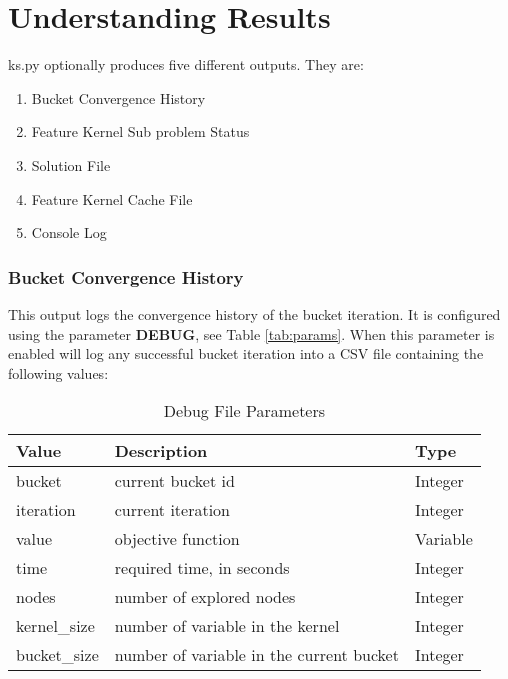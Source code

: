 \section{Understanding Results}
    ks.py optionally produces five different outputs. They are:
    \begin{enumerate}
        \item Bucket Convergence History
        \item Feature Kernel Sub problem Status
        \item Solution File
        \item Feature Kernel Cache File 
        \item Console Log
    \end{enumerate}
    
    \subsubsection{Bucket Convergence History} 
        This output logs the convergence history of the bucket iteration. It is configured using the parameter 
        \textbf{DEBUG}, see Table \ref{tab:params}. When this parameter is enabled will log any successful bucket iteration into a CSV file containing the following
        values:
            \begin{table}[h]
                \centering
                \caption{Debug File Parameters}
                \begin{tabular}{|l|l|l|}
                    \hline
                    Value & Description & Type \\
                    \hline
                    \hline
                    bucket & current bucket id  & Integer\\
                    \hline
                    iteration & current iteration  & Integer\\
                    \hline
                    value & objective function &  Variable\footnotemark\\
                    \hline
                    time & required time, in seconds & Integer \\
                    \hline
                    nodes & number of explored nodes & Integer\\
                    \hline
                    kernel\_size & number of variable in the kernel & Integer\\
                    \hline
                    bucket\_size & number of variable in the current bucket & Integer \\
                    \hline
                \end{tabular}
            \end{table} 
        
